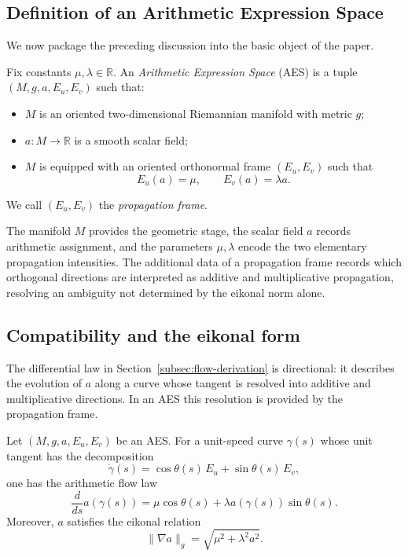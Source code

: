 
\subsection{Definition of an Arithmetic Expression Space}\label{subsec:aes-definition}
We now package the preceding discussion into the basic object of the paper.

\begin{definition}\label{def:aes}
Fix constants $\mu,\lambda\in\mathbb{R}$. An \emph{Arithmetic Expression Space} (AES) is a tuple $(M,g,a,E_u,E_v)$ such that:
\begin{itemize}
    \item $M$ is an oriented two-dimensional Riemannian manifold with metric $g$;
    \item $a:M\to\mathbb{R}$ is a smooth scalar field;
    \item $M$ is equipped with an oriented orthonormal frame $(E_u,E_v)$ such that
    \begin{equation}\label{eq:aes-directional}
        E_u(a)=\mu,
        \qquad
        E_v(a)=\lambda a.
    \end{equation}
\end{itemize}
We call $(E_u,E_v)$ the \emph{propagation frame}.
\end{definition}

The manifold $M$ provides the geometric stage, the scalar field $a$ records arithmetic assignment, and the parameters $\mu,\lambda$ encode the two elementary propagation intensities. The additional data of a propagation frame records which orthogonal directions are interpreted as additive and multiplicative propagation, resolving an ambiguity not determined by the eikonal norm alone.

\subsection{Compatibility and the eikonal form}\label{subsec:aes-eikonal}
The differential law in Section~\ref{subsec:flow-derivation} is directional: it describes the evolution of $a$ along a curve whose tangent is resolved into additive and multiplicative directions. In an AES this resolution is provided by the propagation frame.

\begin{proposition}\label{prop:aes-flow-eikonal}
Let $(M,g,a,E_u,E_v)$ be an AES. For a unit-speed curve $\gamma(s)$ whose unit tangent has the decomposition
\[
\dot\gamma(s)=\cos\theta(s)\,E_u+\sin\theta(s)\,E_v,
\]
one has the arithmetic flow law
\begin{equation}\label{eq:aes-flow}
\frac{d}{ds}a(\gamma(s))=\mu\cos\theta(s)+\lambda a(\gamma(s))\sin\theta(s).
\end{equation}
Moreover, $a$ satisfies the eikonal relation
\begin{equation}\label{eq:aes-eikonal}
\|\nabla a\|_g=\sqrt{\mu^2+\lambda^2 a^2}.
\end{equation}
\end{proposition}


